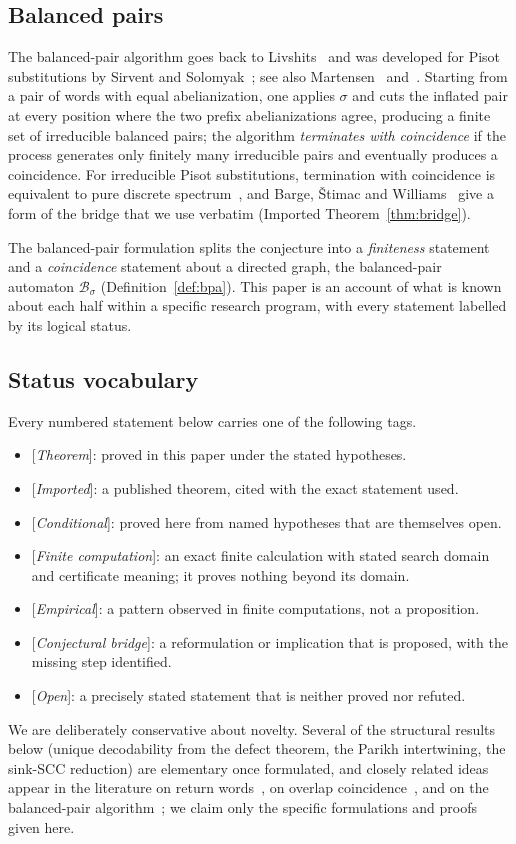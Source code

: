 \documentclass[11pt]{amsart}
\theoremstyle{plain}
\theoremstyle{definition}
\theoremstyle{remark}
\newcommand{\B}{\mathcal{B}}
\newcommand{\PDS}{pure discrete spectrum}
\newcommand{\Status}[1]{\textup{[\textit{#1}]}}
\begin{document}
\subsection{Balanced pairs}
The balanced-pair algorithm goes back to Livshits~\cite{Livshits} and was developed for Pisot substitutions by Sirvent and Solomyak~\cite{SS}; see also Martensen~\cite{Martensen} and~\cite[\S5]{ABBLS}. Starting from a pair of words with equal abelianization, one applies $\sigma$ and cuts the inflated pair at every position where the two prefix abelianizations agree, producing a finite set of irreducible balanced pairs; the algorithm \emph{terminates with coincidence} if the process generates only finitely many irreducible pairs and eventually produces a coincidence. For irreducible Pisot substitutions, termination with coincidence is equivalent to \PDS{}~\cite[Thm.~5.3]{ABBLS}, and Barge, \v{S}timac and Williams~\cite{BSW} give a form of the bridge that we use verbatim (Imported Theorem~\ref{thm:bridge}).

The balanced-pair formulation splits the conjecture into a \emph{finiteness} statement and a \emph{coincidence} statement about a directed graph, the balanced-pair automaton $\B_\sigma$ (Definition~\ref{def:bpa}). This paper is an account of what is known about each half within a specific research program, with every statement labelled by its logical status.

\subsection{Status vocabulary}\label{sec:vocab}
Every numbered statement below carries one of the following tags.
\begin{itemize}[leftmargin=*]
\item \Status{Theorem}: proved in this paper under the stated hypotheses.
\item \Status{Imported}: a published theorem, cited with the exact statement used.
\item \Status{Conditional}: proved here from named hypotheses that are themselves open.
\item \Status{Finite computation}: an exact finite calculation with stated search domain and certificate meaning; it proves nothing beyond its domain.
\item \Status{Empirical}: a pattern observed in finite computations, not a proposition.
\item \Status{Conjectural bridge}: a reformulation or implication that is proposed, with the missing step identified.
\item \Status{Open}: a precisely stated statement that is neither proved nor refuted.
\end{itemize}
We are deliberately conservative about novelty. Several of the structural results below (unique decodability from the defect theorem, the Parikh intertwining, the sink-SCC reduction) are elementary once formulated, and closely related ideas appear in the literature on return words~\cite{Durand}, on overlap coincidence~\cite{Solomyak97,AL}, and on the balanced-pair algorithm~\cite{SS,ABBLS}; we claim only the specific formulations and proofs given here.
\end{document}
